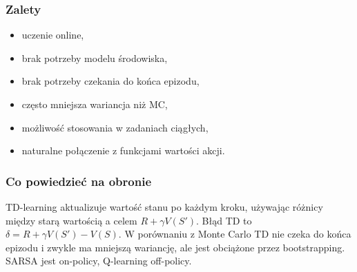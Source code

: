 \subsubsection{Zalety}

\begin{itemize}
  \item uczenie online,
  \item brak potrzeby modelu środowiska,
  \item brak potrzeby czekania do końca epizodu,
  \item często mniejsza wariancja niż MC,
  \item możliwość stosowania w zadaniach ciągłych,
  \item naturalne połączenie z funkcjami wartości akcji.
\end{itemize}

\subsubsection{Co powiedzieć na obronie}

TD-learning aktualizuje wartość stanu po każdym kroku, używając różnicy między starą wartością a celem $R+\gamma V(S')$. Błąd TD to $\delta=R+\gamma V(S')-V(S)$. W porównaniu z Monte Carlo TD nie czeka do końca epizodu i zwykle ma mniejszą wariancję, ale jest obciążone przez bootstrapping. SARSA jest on-policy, Q-learning off-policy.
